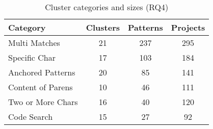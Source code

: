 \begin{table}
\begin{center}
\begin{small}

\caption{Cluster categories and sizes (RQ4) \label{tab:clustercats}}
\begin{tabular}{lccc}
\toprule
\textbf{Category} & \textbf{Clusters} & \textbf{Patterns} & \textbf{Projects} \\  \midrule \bigstrut
Multi Matches & 21 & 237 & 295\\
\midrule \bigstrut
Specific Char & 17 & 103 & 184\\
\midrule \bigstrut
Anchored Patterns & 20 & 85 & 141\\
\midrule \bigstrut
 Content of Parens & 10 & 46 & 111\\
\midrule \bigstrut
Two or More Chars & 16 & 40 & 120\\
\midrule \bigstrut
Code Search & 15 & 27 & 92 \\
\bottomrule
\end{tabular}
\vspace{-12pt}
\end{small}
\end{center}
\end{table}
